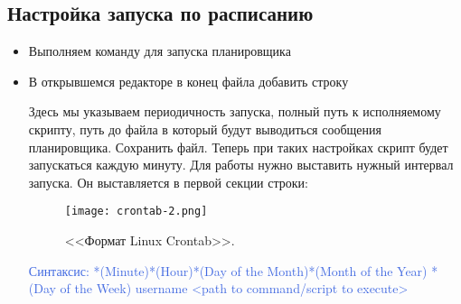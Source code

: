 \subsection{Настройка запуска по расписанию}

\begin{itemize}
	\item  Выполняем команду для запуска планировщика
	
%		
	
	\item В открывшемся редакторе в конец файла добавить строку
	
	
		
%		
	Здесь мы указываем периодичность запуска, полный путь к исполняемому скрипту, путь до файла в который будут выводиться сообщения планировщика.
	Сохранить файл. Теперь при таких настройках скрипт будет запускаться каждую минуту. Для работы нужно выставить нужный интервал запуска.	Он выставляется в первой секции строки:
	
	\begin{figure}[H]
		\texttt{[image: crontab-2.png]}
		\caption{<<Формат Linux Crontab>>.}
		\label{ris:crontab-2.png}
	\end{figure}
	
	\textcolor{RoyalBlue}{Синтаксис:
	*(Minute)*(Hour)*(Day of the Month)*(Month of the Year) *(Day of the Week) username <path to command/script to execute>}


	
	\begin{tabular}{|l|l|}
		

\end{tabular}
\end{itemize}
